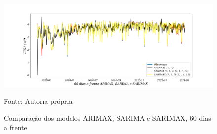 \begin{figure}[H]
	\centering
	\caption{Comparação dos modelos ARIMAX, SARIMA e SARIMAX, 60 dias a frente }
	\label{fig:60-ARIMAX-SARIMA-SARIMAX24}
	\includegraphics[width=1\linewidth]{Apendices/Figuras/modelagem-24h/60-ARIMAX-SARIMA-SARIMAX}
	
	Fonte: Autoria própria.
\end{figure}